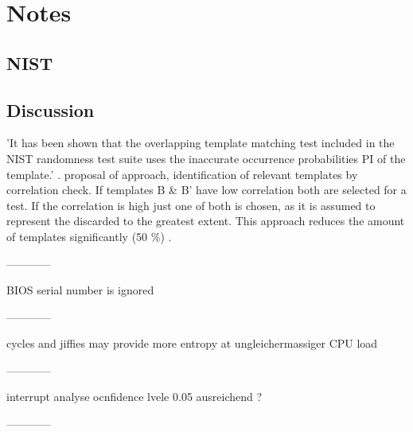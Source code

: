 \chapter{Notes}
\label{cha:notes}


\section{NIST}




\section{Discussion}

'It has been shown that the overlapping template matching test included in the NIST randomness test suite uses the inaccurate occurrence probabilities PI of the template.'
\cite{hamano2007correction,chen2016templates}. \cite{chen2016templates} proposal of approach, identification of relevant templates by correlation check. If templates B \&  B' have low correlation
both are selected for a test. If the correlation is high just one of both is chosen, as it is assumed to represent the discarded to the greatest extent. This approach reduces the amount of templates significantly (50 \%) \cite{chen2016templates}.

------------

BIOS serial number is ignored

------------

cycles and jiffies may provide more entropy at ungleichermassiger CPU load

------------

interrupt analyse ocnfidence lvele 0.05 ausreichend ?

------------
